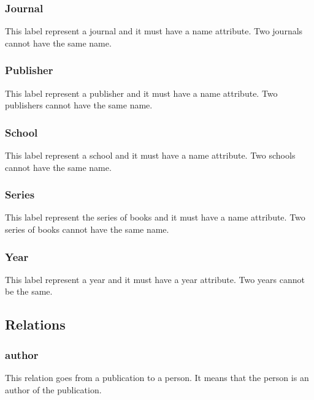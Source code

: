 \documentclass{article}
\begin{document}
\subsubsection{Journal}
This label represent a journal and it must have a name attribute. Two journals cannot have the same name.

\subsubsection{Publisher}
This label represent a publisher and it must have a name attribute. Two publishers cannot have the same name.

\subsubsection{School}
This label represent a school and it must have a name attribute. Two schools cannot have the same name.

\subsubsection{Series}
This label represent the series of books and it must have a name attribute. Two series of books cannot have the same name.

\subsubsection{Year}
This label represent a year and it must have a year attribute. Two years cannot be the same.

\subsection{Relations}

\subsubsection{author}
This relation goes from a publication to a person. It means that the person is an author of the publication.

\begin{center}
\end{center}
\end{document}
